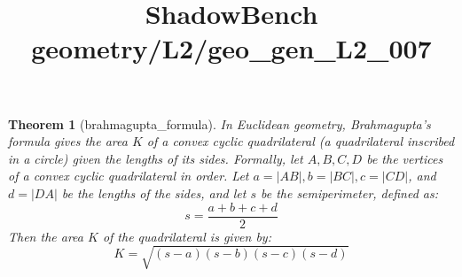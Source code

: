 \documentclass{article}
\title{ShadowBench geometry/L2/geo\_gen\_L2\_007}
\newtheorem{theorem}{Theorem}
\begin{document}
\maketitle

\begin{theorem}[brahmagupta_formula]\label{thm:brahmagupta_formula}
In Euclidean geometry, Brahmagupta's formula gives the area $K$ of a convex cyclic quadrilateral (a quadrilateral inscribed in a circle) given the lengths of its sides. 
Formally, let $A, B, C, D$ be the vertices of a convex cyclic quadrilateral in order. Let $a = |AB|, b = |BC|, c = |CD|$, and $d = |DA|$ be the lengths of the sides, and let $s$ be the semiperimeter, defined as:
\[
s = \frac{a + b + c + d}{2}
\]
Then the area $K$ of the quadrilateral is given by:
\[
K = \sqrt{(s - a)(s - b)(s - c)(s - d)}
\]
\end{theorem}
\end{document}
